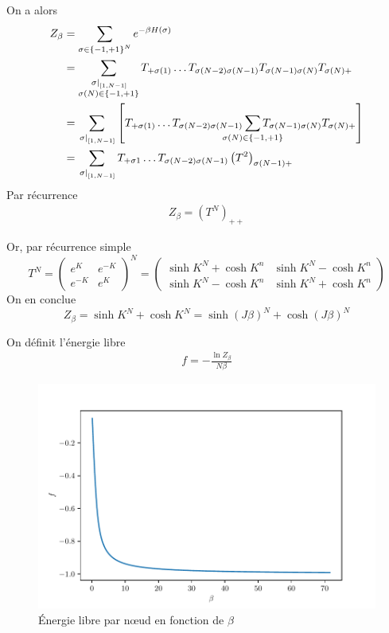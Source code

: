 \documentclass[french]{beamer}
\begin{document}
\begin{frame}
On a alors
\begin{align*}
Z_\beta &= \sum_{\sigma \in \left\{-1, +1\right\}^N} e^{-\beta H(\sigma)} \\
&=\sum_{\substack{\left.\sigma\right|_{\left[1, N-1\right]} \\ \sigma(N) \in \left\{-1, +1\right\}}}  T_{+\sigma(1)} \dots T_{\sigma(N-2)\sigma(N-1)}T_{\sigma(N-1)\sigma(N)} T_{\sigma(N)+} \\
&= \sum_{\left.\sigma\right|_{\left[1, N-1\right]}}  \left[ T_{+\sigma(1)} \dots T_{\sigma(N-2)\sigma(N-1)} \sum_{\mathclap{\sigma(N) \in \left\{-1, +1\right\}}} T_{\sigma(N-1)\sigma(N)} T_{\sigma(N)+} \right] \\
&= \sum_{\left.\sigma\right|_{\left[1, N-1\right]}} T_{+\sigma1}\dots T_{\sigma(N-2)\sigma(N-1)} \left(T^2\right)_{\sigma(N-1)+}
\end{align*}
Par récurrence
\begin{align*}
    Z_\beta = (T^N)_ {++}
\end{align*}
\end{frame}

\begin{frame}
    Or, par récurrence simple
    \[T^N =
    \begin{pmatrix}
    e^{K}& e^{-K} \\
    e^{-K} & e^{K}
    \end{pmatrix}^N
    =
        \begin{pmatrix}
    \sinh{K}^N + \cosh{K}^n &  \sinh{K}^N - \cosh{K}^n\\
    \sinh{K}^N - \cosh{K}^n &  \sinh{K}^N + \cosh{K}^n
    \end{pmatrix}
    \]
    On en conclue
    \[
    Z_\beta = \sinh{K}^N + \cosh{K}^N = \sinh{(J\beta)}^N + \cosh{(J\beta)}^N
    \]
\end{frame}

\begin{frame}
On définit l'énergie libre
\begin{align*}
	f = - \frac{\ln Z_\beta}{N \beta}
\end{align*}
\begin{figure}
	\centering
	\includegraphics[height=0.5\textheight]{assets/Elibre}
	\caption{\'Energie libre par n\oe{}ud en fonction de $\beta$}
	\label{fig:elibre}
\end{figure}
\end{frame}
\end{document}
